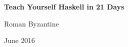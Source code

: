 \thispagestyle{empty}
\begin{center}

\huge{\textbf{Teach Yourself Haskell in 21 Days}}

\null
\vfill

\Large{Roman Byzantine}

\large{June 2016}

\end{center}

\newpage
